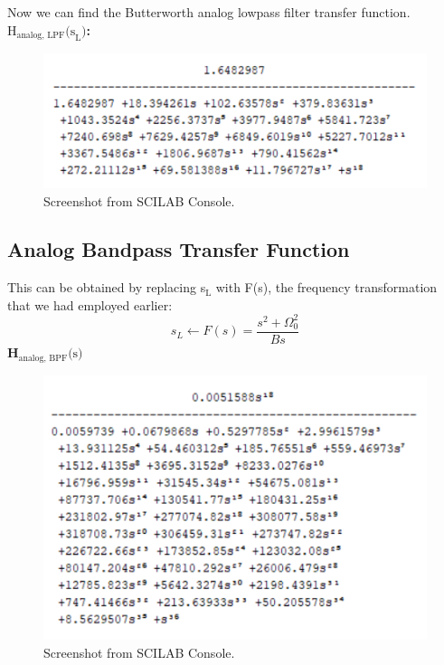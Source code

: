 \documentclass[12pt]{article}
\begin{document}
Now we can find the Butterworth analog lowpass filter transfer function.
\newpage
\textbf{$\text{H}_{\text{analog, LPF}}\text{(s}_\text{L}\text{)}$:}
\begin{figure}[h]
    \centering
    \includegraphics{h_analog_lowpass.png}
    \caption{Screenshot from SCILAB Console.}
\end{figure}

\subsection{Analog Bandpass Transfer Function}
This can be obtained by replacing s$_\text{L}$ with F(s), the frequency transformation that we had employed earlier:
\[s_L \leftarrow F(s) = \frac{s^2 + \Omega_0^2}{Bs}\]
\textbf{H$_{\text{analog, BPF}}\text{(s)}$}
\begin{figure}[h]
    \centering
    \includegraphics{h_analog_bandpass.png}
    \caption{Screenshot from SCILAB Console.}
\end{figure}
\end{document}
